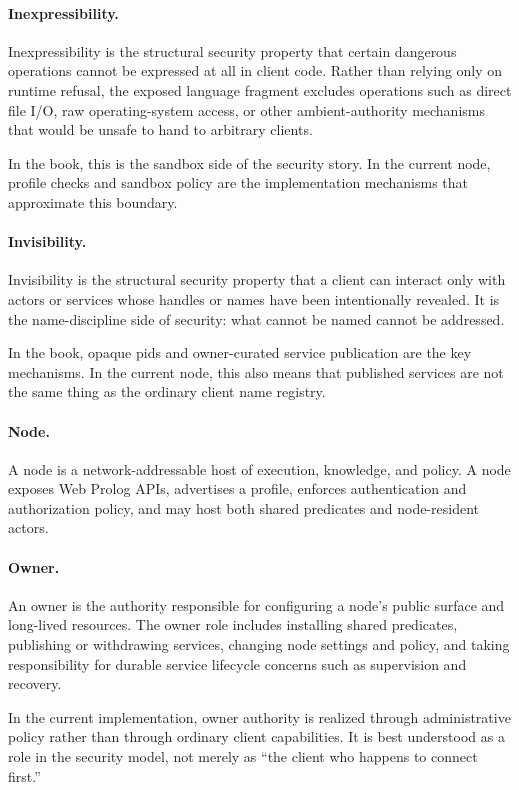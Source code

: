 \paragraph{Inexpressibility.}
Inexpressibility is the structural security property that certain dangerous
operations cannot be expressed at all in client code. Rather than relying only
on runtime refusal, the exposed language fragment excludes operations such as
direct file I/O, raw operating-system access, or other ambient-authority
mechanisms that would be unsafe to hand to arbitrary clients.

In the book, this is the sandbox side of the security story. In the current
node, profile checks and sandbox policy are the implementation mechanisms that
approximate this boundary.

\paragraph{Invisibility.}
Invisibility is the structural security property that a client can interact only
with actors or services whose handles or names have been intentionally revealed.
It is the name-discipline side of security: what cannot be named cannot be
addressed.

In the book, opaque pids and owner-curated service publication are the key
mechanisms. In the current node, this also means that published services are not
the same thing as the ordinary client name registry.

\paragraph{Node.}
A node is a network-addressable host of execution, knowledge, and policy. A
node exposes Web Prolog APIs, advertises a profile, enforces authentication and
authorization policy, and may host both shared predicates and node-resident
actors.

\paragraph{Owner.}
An owner is the authority responsible for configuring a node's public surface
and long-lived resources. The owner role includes installing shared predicates,
publishing or withdrawing services, changing node settings and policy, and
taking responsibility for durable service lifecycle concerns such as supervision
and recovery.

In the current implementation, owner authority is realized through
administrative policy rather than through ordinary client capabilities. It is
best understood as a role in the security model, not merely as ``the client who
happens to connect first.''

